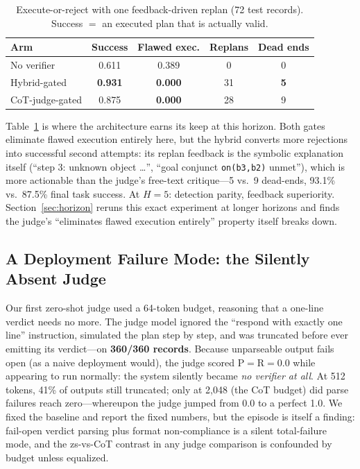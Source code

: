\documentclass[letterpaper]{article}
\begin{document}
\begin{table}[t]
\centering
\small
\setlength{\tabcolsep}{3pt}
\begin{tabular}{lcccc}
\toprule
Arm & Success & Flawed exec. & Replans & Dead ends \\
\midrule
No verifier & 0.611 & 0.389 & 0 & 0 \\
Hybrid-gated & \textbf{0.931} & \textbf{0.000} & 31 & \textbf{5} \\
CoT-judge-gated & 0.875 & \textbf{0.000} & 28 & 9 \\
\bottomrule
\end{tabular}
\caption{Execute-or-reject with one feedback-driven replan (72 test
records). Success $=$ an executed plan that is actually valid.}
\label{tab:downstream}
\end{table}

Table~\ref{tab:downstream} is where the architecture earns its keep at this
horizon. Both gates eliminate flawed execution entirely here, but the
hybrid converts more rejections into successful second attempts: its
replan feedback is the symbolic explanation itself (``step 3: unknown
object \dots'', ``goal conjunct \texttt{on(b3,b2)} unmet''), which is more
actionable than the judge's free-text critique---5 vs.\ 9 dead-ends, 93.1\%
vs.\ 87.5\% final task success. At $H{=}5$: detection parity, feedback
superiority. Section~\ref{sec:horizon} reruns this exact experiment at
longer horizons and finds the judge's ``eliminates flawed execution
entirely'' property itself breaks down.

\subsection{A Deployment Failure Mode: the Silently Absent Judge}
\label{sec:budget}

Our first zero-shot judge used a 64-token budget, reasoning that a
one-line verdict needs no more. The judge model ignored the ``respond with
exactly one line'' instruction, simulated the plan step by step, and was
truncated before ever emitting its verdict---on \textbf{360/360 records}.
Because unparseable output fails open (as a naive deployment would), the
judge scored P$=$R$=$0.0 while appearing to run normally: the system
silently became \emph{no verifier at all}. At 512 tokens, 41\% of outputs
still truncated; only at 2{,}048 (the CoT budget) did parse failures reach
zero---whereupon the judge jumped from 0.0 to a perfect 1.0. We fixed the
baseline and report the fixed numbers, but the episode is itself a finding:
fail-open verdict parsing plus format non-compliance is a silent
total-failure mode, and the zs-vs-CoT contrast in any judge comparison is
confounded by budget unless equalized.
\end{document}
